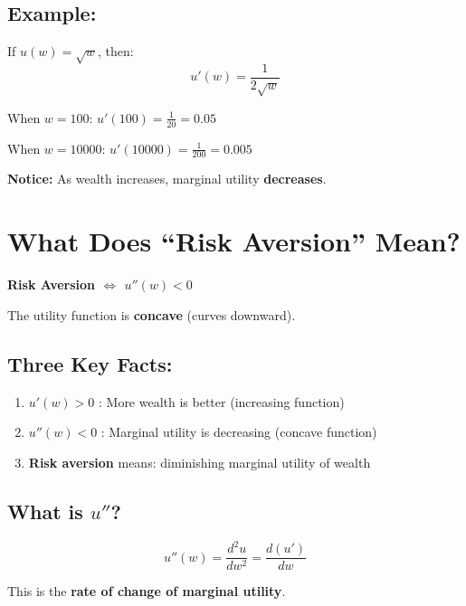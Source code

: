 \documentclass[12pt]{article}
\begin{document}
\subsection*{Example:}

If $u(w) = \sqrt{w}$, then:
$$u'(w) = \frac{1}{2\sqrt{w}}$$

When $w = 100$: $u'(100) = \frac{1}{20} = 0.05$

When $w = 10000$: $u'(10000) = \frac{1}{200} = 0.005$

\textbf{Notice:} As wealth increases, marginal utility \textbf{decreases}.

\newpage

\section*{What Does ``Risk Aversion'' Mean?}

\begin{center}
\colorbox{green!20}{
\begin{minipage}{0.9\textwidth}
\textbf{Risk Aversion $\Leftrightarrow$ $u''(w) < 0$}

The utility function is \textbf{concave} (curves downward).
\end{minipage}
}
\end{center}

\subsection*{Three Key Facts:}

\begin{enumerate}
    \item $u'(w) > 0$ : More wealth is better (increasing function)

    \item $u''(w) < 0$ : Marginal utility is decreasing (concave function)

    \item \textbf{Risk aversion} means: diminishing marginal utility of wealth
\end{enumerate}

\subsection*{What is $u''$?}

$$u''(w) = \frac{d^2u}{dw^2} = \frac{d(u')}{dw}$$

This is the \textbf{rate of change of marginal utility}.
\end{document}
